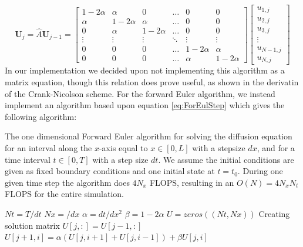 \documentclass[a4paper,10pt,english]{article}
\renewcommand{\vec}[1]{\mathbf{#1}}
\begin{document}
\begin{equation}
\vec{U}_{j} = \hat{A} \vec{U}_{j-1} = \begin{bmatrix}1 - 2 \alpha & \alpha  & 0 & \hdots & 0 & 0 \\ \alpha & 1 - 2 \alpha & \alpha &  \hdots & 0 & 0 \\ 0 & \alpha & 1 - 2 \alpha  & \hdots & 0 & 0 \\ \vdots & \vdots & \vdots  & \ddots & \vdots & \vdots \\0 & 0 & 0 &  \hdots & 1 - 2\alpha &  \alpha  \\ 0 & 0 & 0 & \hdots &  \alpha  & 1 - 2\alpha \end{bmatrix}\begin{bmatrix}
u_{1,j} \\ u_{2,j} \\ u_{3,j} \\ \vdots \\ u_{N-1,j} \\ u_{N,j}
\end{bmatrix}
\label{eq:FEMatrix}
\end{equation}
In our implementation we decided upon not implementing this algorithm as a matrix equation, though this relation does prove useful, as shown in the derivatin of the Crank-Nicolson scheme. For the forward Euler algorithm, we instead implement an algorithm based upon equation \ref{eq:ForEulStep} which gives the following algorithm:
\begin{algorithm}[H]
\centering
\caption{The one dimensional Forward Euler algorithm for solving the diffusion equation for an interval along the $x$-axis equal to $x \in [0,L]$ with a stepsize $dx$, and for a time interval $t \in [0,T]$ with a step size $dt$. We assume the initial conditions are given as fixed boundary conditions and one initial state at $t=t_0$. During one given time step the algorithm does $4N_x$ \textsc{FLOPS}, resulting in an $O(N) = 4N_x N_t$  \textsc{FLOPS} for the entire simulation. \label{alg:FWE_1D}}
	\begin{algorithmic}[1]
		\State $Nt = T/dt$
		\State $Nx = /dx$
		\State $\alpha = dt/dx^2$
		\State $\beta = 1 - 2\alpha$
		\State $U = zeros((Nt,Nx))$
		\Comment Creating solution matrix
			\State $U[j,:] = U[j-1,:]$
				\State $U[j+1,i] = \alpha(U[j,i+1] + U[j,i-1]) + \beta U[j,i]$
			\EndFor
		\EndFor
 
	\end{algorithmic}
\end{algorithm}
\end{document}
